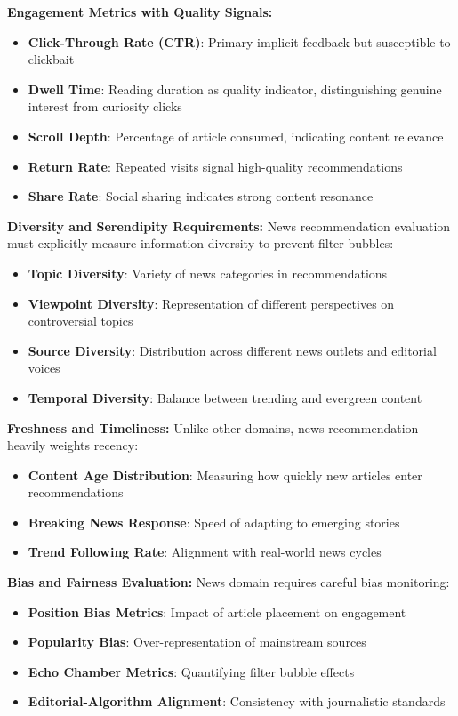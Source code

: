 \textbf{Engagement Metrics with Quality Signals:}
\begin{itemize}
    \item \textbf{Click-Through Rate (CTR)}: Primary implicit feedback but susceptible to clickbait
    \item \textbf{Dwell Time}: Reading duration as quality indicator, distinguishing genuine interest from curiosity clicks
    \item \textbf{Scroll Depth}: Percentage of article consumed, indicating content relevance
    \item \textbf{Return Rate}: Repeated visits signal high-quality recommendations
    \item \textbf{Share Rate}: Social sharing indicates strong content resonance
\end{itemize}

\textbf{Diversity and Serendipity Requirements:}
News recommendation evaluation must explicitly measure information diversity to prevent filter bubbles:
\begin{itemize}
    \item \textbf{Topic Diversity}: Variety of news categories in recommendations
    \item \textbf{Viewpoint Diversity}: Representation of different perspectives on controversial topics
    \item \textbf{Source Diversity}: Distribution across different news outlets and editorial voices
    \item \textbf{Temporal Diversity}: Balance between trending and evergreen content
\end{itemize}

\textbf{Freshness and Timeliness:}
Unlike other domains, news recommendation heavily weights recency:
\begin{itemize}
    \item \textbf{Content Age Distribution}: Measuring how quickly new articles enter recommendations
    \item \textbf{Breaking News Response}: Speed of adapting to emerging stories
    \item \textbf{Trend Following Rate}: Alignment with real-world news cycles
\end{itemize}

\textbf{Bias and Fairness Evaluation:}
News domain requires careful bias monitoring:
\begin{itemize}
    \item \textbf{Position Bias Metrics}: Impact of article placement on engagement
    \item \textbf{Popularity Bias}: Over-representation of mainstream sources
    \item \textbf{Echo Chamber Metrics}: Quantifying filter bubble effects
    \item \textbf{Editorial-Algorithm Alignment}: Consistency with journalistic standards
\end{itemize}


